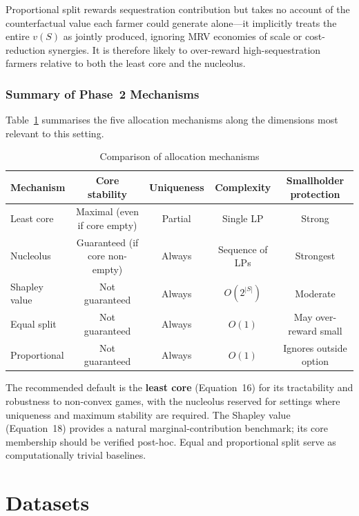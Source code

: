 \documentclass[manuscript, screen, review, anonymous]{acmart}
\begin{document}
Proportional split rewards sequestration contribution but takes no account of
the counterfactual value each farmer could generate alone---it implicitly treats
the entire $v(S)$ as jointly produced, ignoring MRV economies of scale or
cost-reduction synergies. It is therefore likely to over-reward high-sequestration
farmers relative to both the least core and the nucleolus.

\subsubsection*{Summary of Phase~2 Mechanisms}

Table~\ref{tab:mechanisms} summarises the five allocation mechanisms along the
dimensions most relevant to this setting.

\begin{table}[h]
\centering
\caption{Comparison of allocation mechanisms}
\label{tab:mechanisms}
\begin{tabular}{lcccc}
\hline
\textbf{Mechanism} & \textbf{Core stability} & \textbf{Uniqueness} & \textbf{Complexity} & \textbf{Smallholder protection} \\
\hline
Least core     & Maximal (even if core empty) & Partial        & Single LP           & Strong \\
Nucleolus      & Guaranteed (if core non-empty) & Always       & Sequence of LPs     & Strongest \\
Shapley value  & Not guaranteed               & Always         & $O(2^{|S|})$        & Moderate \\
Equal split    & Not guaranteed               & Always         & $O(1)$              & May over-reward small \\
Proportional   & Not guaranteed               & Always         & $O(1)$              & Ignores outside option \\
\hline
\end{tabular}
\end{table}

\noindent The recommended default is the \textbf{least core} (Equation~16) for
its tractability and robustness to non-convex games, with the nucleolus reserved
for settings where uniqueness and maximum stability are required. The Shapley
value (Equation~18) provides a natural marginal-contribution benchmark; its
core membership should be verified post-hoc. Equal and proportional split serve
as computationally trivial baselines.


\newpage
\section{Datasets}
\end{document}
